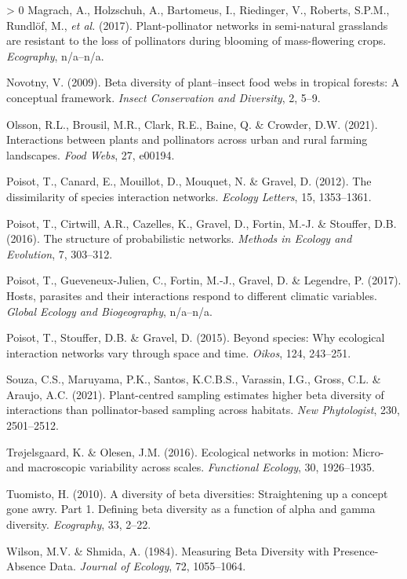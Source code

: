 \documentclass[11pt]{article}
\newlength{\cslhangindent}
\newenvironment{CSLReferences}[3] %
 {%
  \setlength{\parindent}{0pt}
  \ifodd #1 \everypar{\setlength{\hangindent}{\cslhangindent}}\ignorespaces\fi
  \ifnum #2 > 0
  \setlength{\parskip}{#2\baselineskip}
  \fi
 }%
 {}
\begin{document}
\begin{CSLReferences}{1}{0}
\leavevmode\hypertarget{ref-Magrach2017PlaNet}{}%
Magrach, A., Holzschuh, A., Bartomeus, I., Riedinger, V., Roberts,
S.P.M., Rundlöf, M., \emph{et al.} (2017). Plant-pollinator networks in
semi-natural grasslands are resistant to the loss of pollinators during
blooming of mass-flowering crops. \emph{Ecography}, n/a--n/a.

\leavevmode\hypertarget{ref-Novotny2009BetDiv}{}%
Novotny, V. (2009). Beta diversity of plant--insect food webs in
tropical forests: A conceptual framework. \emph{Insect Conservation and
Diversity}, 2, 5--9.

\leavevmode\hypertarget{ref-Olsson2021IntPla}{}%
Olsson, R.L., Brousil, M.R., Clark, R.E., Baine, Q. \& Crowder, D.W.
(2021). Interactions between plants and pollinators across urban and
rural farming landscapes. \emph{Food Webs}, 27, e00194.

\leavevmode\hypertarget{ref-Poisot2012DisSpe}{}%
Poisot, T., Canard, E., Mouillot, D., Mouquet, N. \& Gravel, D. (2012).
The dissimilarity of species interaction networks. \emph{Ecology
Letters}, 15, 1353--1361.

\leavevmode\hypertarget{ref-Poisot2016StrPro}{}%
Poisot, T., Cirtwill, A.R., Cazelles, K., Gravel, D., Fortin, M.-J. \&
Stouffer, D.B. (2016). The structure of probabilistic networks.
\emph{Methods in Ecology and Evolution}, 7, 303--312.

\leavevmode\hypertarget{ref-Poisot2017HosPar}{}%
Poisot, T., Gueveneux-Julien, C., Fortin, M.-J., Gravel, D. \& Legendre,
P. (2017). Hosts, parasites and their interactions respond to different
climatic variables. \emph{Global Ecology and Biogeography}, n/a--n/a.

\leavevmode\hypertarget{ref-Poisot2015SpeWhy}{}%
Poisot, T., Stouffer, D.B. \& Gravel, D. (2015). Beyond species: Why
ecological interaction networks vary through space and time.
\emph{Oikos}, 124, 243--251.

\leavevmode\hypertarget{ref-Souza2021PlaSam}{}%
Souza, C.S., Maruyama, P.K., Santos, K.C.B.S., Varassin, I.G., Gross,
C.L. \& Araujo, A.C. (2021). Plant-centred sampling estimates higher
beta diversity of interactions than pollinator-based sampling across
habitats. \emph{New Phytologist}, 230, 2501--2512.

\leavevmode\hypertarget{ref-Trojelsgaard2016EcoNet}{}%
Trøjelsgaard, K. \& Olesen, J.M. (2016). Ecological networks in motion:
Micro- and macroscopic variability across scales. \emph{Functional
Ecology}, 30, 1926--1935.

\leavevmode\hypertarget{ref-Tuomisto2010DivBet}{}%
Tuomisto, H. (2010). A diversity of beta diversities: Straightening up a
concept gone awry. Part 1. Defining beta diversity as a function of
alpha and gamma diversity. \emph{Ecography}, 33, 2--22.

\leavevmode\hypertarget{ref-Wilson1984MeaBet}{}%
Wilson, M.V. \& Shmida, A. (1984). Measuring Beta Diversity with
Presence-Absence Data. \emph{Journal of Ecology}, 72, 1055--1064.

\end{CSLReferences}
\end{document}
